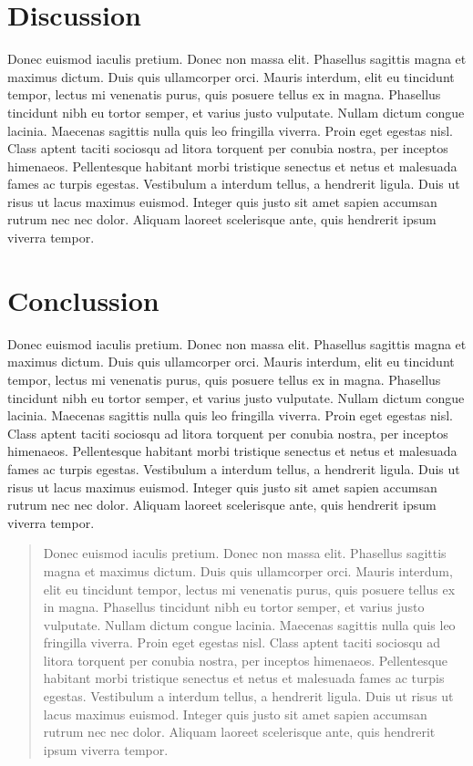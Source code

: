 \documentclass[format=acmsmall, review=false, screen=true]{acmart}
\begin{document}
\section{Discussion}

Donec euismod iaculis pretium. Donec non massa elit. Phasellus sagittis magna et maximus dictum. Duis quis ullamcorper orci. Mauris interdum, elit eu tincidunt tempor, lectus mi venenatis purus, quis posuere tellus ex in magna. Phasellus tincidunt nibh eu tortor semper, et varius justo vulputate. Nullam dictum congue lacinia. Maecenas sagittis nulla quis leo fringilla viverra. Proin eget egestas nisl. Class aptent taciti sociosqu ad litora torquent per conubia nostra, per inceptos himenaeos. Pellentesque habitant morbi tristique senectus et netus et malesuada fames ac turpis egestas. Vestibulum a interdum tellus, a hendrerit ligula. Duis ut risus ut lacus maximus euismod. Integer quis justo sit amet sapien accumsan rutrum nec nec dolor. Aliquam laoreet scelerisque ante, quis hendrerit ipsum viverra tempor.

\section{Conclussion}

Donec euismod iaculis pretium. Donec non massa elit. Phasellus sagittis magna et maximus dictum. Duis quis ullamcorper orci. Mauris interdum, elit eu tincidunt tempor, lectus mi venenatis purus, quis posuere tellus ex in magna. Phasellus tincidunt nibh eu tortor semper, et varius justo vulputate. Nullam dictum congue lacinia. Maecenas sagittis nulla quis leo fringilla viverra. Proin eget egestas nisl. Class aptent taciti sociosqu ad litora torquent per conubia nostra, per inceptos himenaeos. Pellentesque habitant morbi tristique senectus et netus et malesuada fames ac turpis egestas. Vestibulum a interdum tellus, a hendrerit ligula. Duis ut risus ut lacus maximus euismod. Integer quis justo sit amet sapien accumsan rutrum nec nec dolor. Aliquam laoreet scelerisque ante, quis hendrerit ipsum viverra tempor.

\renewcommand{\abstractname}{Acknowledgements}
\begin{abstract}
Donec euismod iaculis pretium. Donec non massa elit. Phasellus sagittis magna et maximus dictum. Duis quis ullamcorper orci. Mauris interdum, elit eu tincidunt tempor, lectus mi venenatis purus, quis posuere tellus ex in magna. Phasellus tincidunt nibh eu tortor semper, et varius justo vulputate. Nullam dictum congue lacinia. Maecenas sagittis nulla quis leo fringilla viverra. Proin eget egestas nisl. Class aptent taciti sociosqu ad litora torquent per conubia nostra, per inceptos himenaeos. Pellentesque habitant morbi tristique senectus et netus et malesuada fames ac turpis egestas. Vestibulum a interdum tellus, a hendrerit ligula. Duis ut risus ut lacus maximus euismod. Integer quis justo sit amet sapien accumsan rutrum nec nec dolor. Aliquam laoreet scelerisque ante, quis hendrerit ipsum viverra tempor.
\end{abstract}
\end{document}

